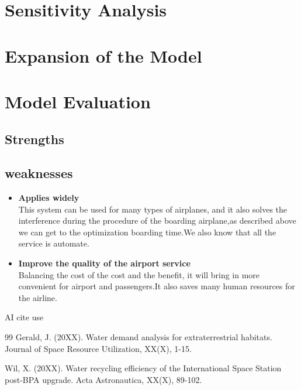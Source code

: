\documentclass{mcmthesis}
\begin{document}
\begin{enumerate}
	\section{Sensitivity Analysis}
	\lipsum[6]
	\section{Expansion of the Model}
	\section{Model Evaluation}
	\subsection{Strengths}
	\lipsum[4]
	\subsection{weaknesses}
	\begin{itemize}
		\item \textbf{Applies widely}\\
		This  system can be used for many types of airplanes, and it also
		solves the interference during  the procedure of the boarding
		airplane,as described above we can get to the  optimization
		boarding time.We also know that all the service is automate.
		\item \textbf{Improve the quality of the airport service}\\
		Balancing the cost of the cost and the benefit, it will bring in
		more convenient  for airport and passengers.It also saves many
		human resources for the airline.
	\end{itemize}
	
	AI cite use 
	
	\cleardoublepage 
	\begin{thebibliography}{99}
		Gerald, J. (20XX). Water demand analysis for extraterrestrial habitats.
		Journal of Space Resource Utilization, XX(X), 1-15.
		
		Wil, X. (20XX). Water recycling efficiency of the International Space Station
		post-BPA upgrade. Acta Astronautica, XX(X), 89-102.
		

\end{thebibliography}
\end{enumerate}
\end{document}
